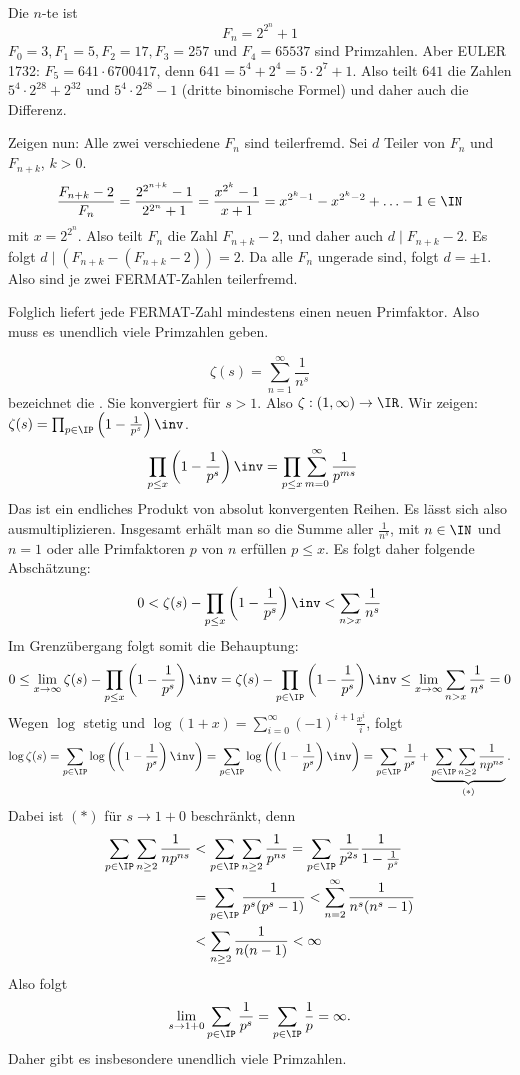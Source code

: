 \begin{Beweis}[EULER]
Die $n$-te  ist
\[F_n=2^{2^n}+1\]
$F_0=3, F_1=5, F_2=17, F_3=257$ und $F_4=65537$ sind Primzahlen. Aber EULER 1732: $F_5=641\cdot 6700417$, denn
$641=5^4+2^4=5\cdot 2^7+1$. Also teilt $641$ die Zahlen $5^4\cdot 2^{28}+2^{32}$ und $5^4\cdot 2^{28}-1$ (dritte binomische Formel) und daher auch die Differenz.

Zeigen nun: Alle zwei verschiedene $F_n$ sind teilerfremd.
Sei $d$ Teiler von $F_n$ und $F_{n+k}$, $k>0$.
\[\frac{F_{n+k}-2}{F_n}=\frac{2^{2^{n+k}}-1}{2^{2^n}+1}=\frac{x^{2^k}-1}{x+1}=x^{2^k-1}-x^{2^k-2}+\ldots-1\in\IN\]
mit $x=2^{2^n}$. Also teilt $F_n$ die Zahl $F_{n+k}-2$, und daher auch $d \mid F_{n+k}-2$. Es folgt $d\mid (F_{n+k}-(F_{n+k}-2))=2$.
Da alle $F_n$ ungerade sind, folgt $d=\pm 1$. Also sind je zwei FERMAT-Zahlen teilerfremd.

Folglich liefert jede FERMAT-Zahl mindestens einen neuen Primfaktor. Also muss es unendlich viele Primzahlen geben.
\end{Beweis}

\begin{Beweis}[EULER]
\[\zeta(s)=\sum_{n=1}^\infty \frac{1}{n^s}\]
bezeichnet die . Sie konvergiert für $s>1$. Also $\zeta:(1,\infty)\rightarrow \IR$.
Wir zeigen: $\zeta(s)=\prod_{p\in\IP}\left(1-\frac{1}{p^s}\right)\inv$.
\begin{align*}
\prod_{p\leq x}\left(1-\frac{1}{p^s}\right)\inv&=\prod_{p\leq x} \sum_{m=0}^\infty \frac{1}{p^{ms}}
\end{align*}
Das ist ein endliches Produkt von absolut konvergenten Reihen. Es lässt sich also ausmultiplizieren. Insgesamt erhält man so die Summe aller $\frac{1}{n^s}$, mit $n\in\IN$ und $n=1$ oder alle Primfaktoren $p$ von $n$ erfüllen $p\leq x$. Es folgt daher folgende Abschätzung:
\[0<\zeta(s)-\prod_{p\leq x}\left(1-\frac{1}{p^s}\right)\inv< \sum_{n>x}\frac{1}{n^s}\]
Im Grenzübergang folgt somit die Behauptung:
\[ 0\leq \lim_{x\rightarrow\infty}\zeta(s)-\prod_{p\leq x}\left(1-\frac{1}{p^s}\right)\inv= \zeta(s)-\prod_{p\in\IP}\left(1-\frac{1}{p^s}\right)\inv\leq \lim_{x\rightarrow\infty} \sum_{n>x}\frac{1}{n^s} =0\]
Wegen $\log$ stetig und $\log(1+x)=\sum_{i=0}^\infty(-1)^{i+1}\frac{x^i}{i}$, folgt \[\log{\zeta(s)}=\sum_{p\in\IP}\log\left(\left(1-\frac{1}{p^s}\right)\inv\right)=\sum_{p\in\IP}\log\left(\left(1-\frac{1}{p^s}\right)\inv\right)=\sum_{p\in\IP} \frac{1}{p^s}+ \underbrace{\sum_{p\in\IP}\sum_{n\geq 2} \frac{1}{np^{ns}}}_{(*)}.\] 
Dabei ist $(*)$ für $s\rightarrow 1+0$ beschränkt, denn 
\begin{align*}
\sum_{p\in\IP}\sum_{n\geq 2} \frac{1}{np^{ns}}&<\sum_{p\in\IP}\sum_{n\geq 2} \frac{1}{p^{ns}}=\sum_{p\in\IP}\frac{1}{p^{2s}}\frac{1}{1-\frac{1}{p^s}}\\
&=\sum_{p\in\IP} \frac{1}{p^s(p^s-1)}<\sum_{n=2}^\infty \frac{1}{n^s(n^s-1)}\\
&<\sum_{n\geq 2} \frac{1}{n(n-1)}<\infty
\end{align*}
Also folgt \[\lim_{s\rightarrow 1+0} \sum_{p\in\IP} \frac{1}{p^s}= \sum_{p\in\IP} \frac{1}{p}=\infty.\]
Daher gibt es insbesondere unendlich viele Primzahlen.
\end{Beweis}

